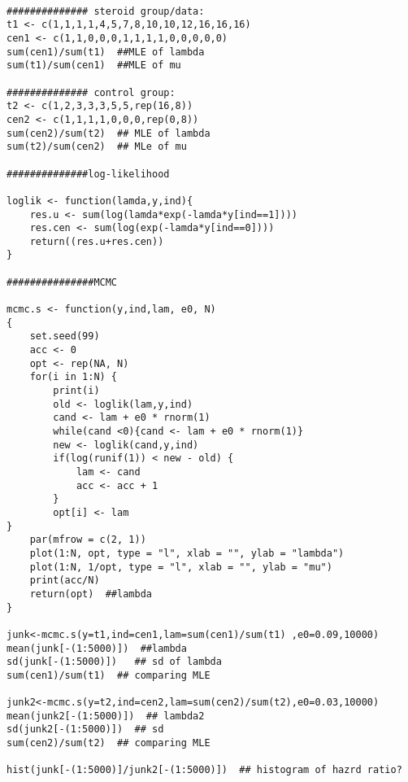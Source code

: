 \begin{verbatim}

############## steroid group/data:
t1 <- c(1,1,1,1,4,5,7,8,10,10,12,16,16,16)
cen1 <- c(1,1,0,0,0,1,1,1,1,0,0,0,0,0)
sum(cen1)/sum(t1)  ##MLE of lambda
sum(t1)/sum(cen1)  ##MLE of mu

############## control group:
t2 <- c(1,2,3,3,3,5,5,rep(16,8))
cen2 <- c(1,1,1,1,0,0,0,rep(0,8))   
sum(cen2)/sum(t2)  ## MLE of lambda
sum(t2)/sum(cen2)  ## MLe of mu

##############log-likelihood

loglik <- function(lamda,y,ind){
	res.u <- sum(log(lamda*exp(-lamda*y[ind==1])))
	res.cen <- sum(log(exp(-lamda*y[ind==0])))
	return((res.u+res.cen))
}

###############MCMC 

mcmc.s <- function(y,ind,lam, e0, N)
{
	set.seed(99)
	acc <- 0
	opt <- rep(NA, N)
	for(i in 1:N) {
		print(i)
		old <- loglik(lam,y,ind)
		cand <- lam + e0 * rnorm(1)
		while(cand <0){cand <- lam + e0 * rnorm(1)}
		new <- loglik(cand,y,ind)
		if(log(runif(1)) < new - old) {
			lam <- cand
			acc <- acc + 1
		}		
		opt[i] <- lam
}
	par(mfrow = c(2, 1))
	plot(1:N, opt, type = "l", xlab = "", ylab = "lambda")
	plot(1:N, 1/opt, type = "l", xlab = "", ylab = "mu")
	print(acc/N)
	return(opt)  ##lambda
}

junk<-mcmc.s(y=t1,ind=cen1,lam=sum(cen1)/sum(t1) ,e0=0.09,10000)
mean(junk[-(1:5000)])  ##lambda
sd(junk[-(1:5000)])   ## sd of lambda
sum(cen1)/sum(t1)  ## comparing MLE 

junk2<-mcmc.s(y=t2,ind=cen2,lam=sum(cen2)/sum(t2),e0=0.03,10000)
mean(junk2[-(1:5000)])  ## lambda2
sd(junk2[-(1:5000)])  ## sd
sum(cen2)/sum(t2)  ## comparing MLE 

hist(junk[-(1:5000)]/junk2[-(1:5000)])  ## histogram of hazrd ratio?


\end{verbatim}









